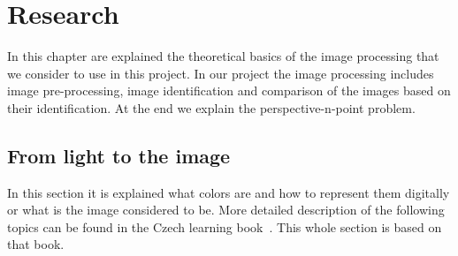 \documentclass[thesis=B,english]{FITthesis}[2019/12/23]
\begin{document}

    
\chapter{Research}
    In this chapter are explained the theoretical basics of the image processing that we consider to use in this project. In our project the image processing includes image pre-processing, image identification and comparison of the images based on their identification. At the end we explain the perspective-n-point problem.
    
    \section{From light to the image}
        In this section it is explained what colors are and how to represent them digitally or what is the image considered to be. More detailed description of the following topics can be found in the Czech learning book~\cite{ZARA2005}. This whole section is based on that book.
\end{document}

